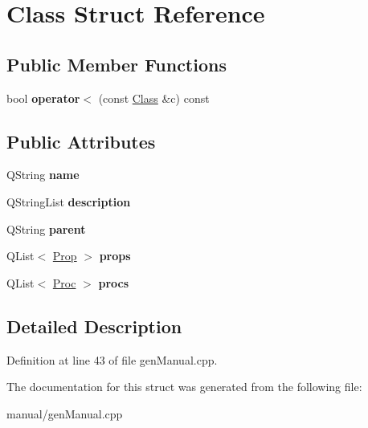 \hypertarget{struct_class}{}\section{Class Struct Reference}
\label{struct_class}
\subsection*{Public Member Functions}
\begin{DoxyCompactItemize}
\item 
\mbox{\label{struct_class_ae4b8d1bd1e5ceb59bbbbe459d4ae665b}} 
bool {\bfseries operator$<$} (const \hyperlink{struct_class}{Class} \&c) const
\end{DoxyCompactItemize}
\subsection*{Public Attributes}
\begin{DoxyCompactItemize}
\item 
\mbox{\label{struct_class_a139402cc020d56156780517b0efe9da5}} 
Q\+String {\bfseries name}
\item 
\mbox{\label{struct_class_ad2048d3e396bb9298265adb024255041}} 
Q\+String\+List {\bfseries description}
\item 
\mbox{\label{struct_class_a35a5013d1236efd172ad8582e266fa2c}} 
Q\+String {\bfseries parent}
\item 
\mbox{\label{struct_class_afe87eb4310139b54eab2e3540025f88b}} 
Q\+List$<$ \hyperlink{struct_prop}{Prop} $>$ {\bfseries props}
\item 
\mbox{\label{struct_class_a744f06e73dddd3d065d0c90cad5039da}} 
Q\+List$<$ \hyperlink{struct_proc}{Proc} $>$ {\bfseries procs}
\end{DoxyCompactItemize}


\subsection{Detailed Description}


Definition at line 43 of file gen\+Manual.\+cpp.



The documentation for this struct was generated from the following file\+:\begin{DoxyCompactItemize}
\item 
manual/gen\+Manual.\+cpp\end{DoxyCompactItemize}
